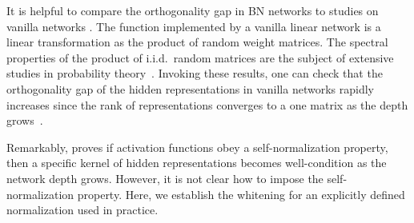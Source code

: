 It is helpful to compare the orthogonality gap in BN networks to studies on vanilla networks \citep{bjorck2018understanding,daneshmand2020batch,saxe2013exact}. The function implemented by a vanilla linear network is a linear transformation as the product of random weight matrices. The spectral properties of the product of i.i.d.~random matrices are the subject of extensive studies in probability theory~\citep{bougerol2012products}. Invoking these results, one can check that the orthogonality gap of the hidden representations in vanilla networks rapidly increases since the rank of representations converges to a one matrix as the depth grows~\citep{daneshmand2020batch}. 

Remarkably, \cite{agarwal2021deep} proves if activation functions obey a self-normalization property, then a specific kernel of hidden representations becomes well-condition as the network depth grows. However, it is not clear how to impose the self-normalization property. Here, we establish the whitening for an explicitly defined normalization used in practice. 



